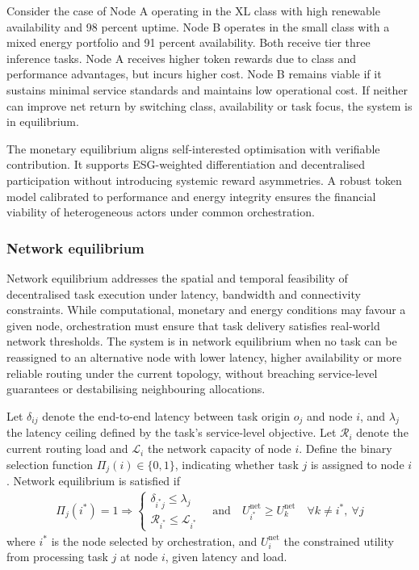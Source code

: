 \documentclass[oneside,10pt]{swissi}
\begin{document}
Consider the case of Node A operating in the XL class with high renewable availability and 98 percent uptime. Node B operates in the small class with a mixed energy portfolio and 91 percent availability. Both receive tier three inference tasks. Node A receives higher token rewards due to class and performance advantages, but incurs higher cost. Node B remains viable if it sustains minimal service standards and maintains low operational cost. If neither can improve net return by switching class, availability or task focus, the system is in equilibrium.

The monetary equilibrium aligns self-interested optimisation with verifiable contribution. It supports ESG-weighted differentiation and decentralised participation without introducing systemic reward asymmetries. A robust token model calibrated to performance and energy integrity ensures the financial viability of heterogeneous actors under common orchestration.

\subsubsection{Network equilibrium}

Network equilibrium addresses the spatial and temporal feasibility of decentralised task execution under latency, bandwidth and connectivity constraints. While computational, monetary and energy conditions may favour a given node, orchestration must ensure that task delivery satisfies real-world network thresholds. The system is in network equilibrium when no task can be reassigned to an alternative node with lower latency, higher availability or more reliable routing under the current topology, without breaching service-level guarantees or destabilising neighbouring allocations.

Let \( \delta_{ij} \) denote the end-to-end latency between task origin \( o_j \) and node \( i \), and \( \lambda_j \) the latency ceiling defined by the task’s service-level objective. Let \( \mathcal{R}_i \) denote the current routing load and \( \mathcal{L}_i \) the network capacity of node \( i \). Define the binary selection function \( \Pi_j(i) \in \{0,1\} \), indicating whether task \( j \) is assigned to node \( i \). Network equilibrium is satisfied if
\begin{align}
\Pi_j(i^*) = 1 \Rightarrow
\begin{cases}
\delta_{i^*j} \leq \lambda_j \\
\mathcal{R}_{i^*} \leq \mathcal{L}_{i^*}
\end{cases}
\quad \text{and} \quad
U_{i^*}^{\text{net}} \ge U_k^{\text{net}} \quad \forall k \ne i^*,\ \forall j
\end{align}
where \( i^* \) is the node selected by orchestration, and \( U_i^{\text{net}} \) the constrained utility from processing task \( j \) at node \( i \), given latency and load.
\end{document}
